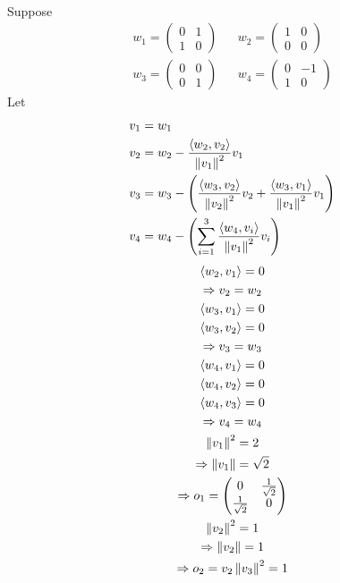 \begin{enumerate}
\begin{itemize}
\begin{gather}
\end{gather}
Suppose
\begin{align}
w_1 = \begin{pmatrix} 0 & 1\\1 & 0\end{pmatrix} & & w_2
= \begin{pmatrix}1 & 0 \\0 & 0 \end{pmatrix} \\
w_3 = \begin{pmatrix} 0 & 0 \\ 0 & 1\end{pmatrix} & &
w_4 =\begin{pmatrix} 0 & -1\\ 1 & 0\end{pmatrix}
\end{align}
Let
\begin{align}
v_1 &= w_1\\
v_2 &= w_2 - \frac{\langle w_2,v_2\rangle}{\left\lVert v_1\right\rVert^2}v_1\\
v_3 &= w_3 - \left(\frac{\langle w_3,v_2\rangle}{\left\lVert v_2\right\rVert^2}v_2 +
  \frac{\langle w_3,v_1\rangle}{\left\lVert v_1\right\rVert^2}v_1\right)\\
v_4 &= w_4 -\left(\sum\limits_{i=1}^3\frac{\langle w_4,v_i\rangle}{\left\lVert v_1\right\rVert^2}v_i\right)
\end{align}
\begin{gather}
\langle w_2,v_1\rangle = 0\\
\implies v_2 = w_2\\
\langle w_3,v_1\rangle = 0\\
\langle w_3,v_2\rangle = 0\\
\implies v_3 = w_3\\
\langle w_4,v_1\rangle = 0\\
\langle w_4,v_2\rangle = 0\\
\langle w_4,v_3\rangle = 0\\
\implies v_4 = w_4\\
\norm{v_1}^2 = 2\\
\implies \norm{v_1} = \sqrt{2}\\
\implies o_1 = \begin{pmatrix}
0 & \frac{1}{\sqrt{2}}\\
\frac{1}{\sqrt{2}} & 0
\end{pmatrix}\\
\norm{v_2}^2 = 1\\
\implies \norm{v_2} = 1\\
\implies o_2 = v_2
\norm{v_3}^2 = 1\\

\end{gather}
\end{itemize}
\end{enumerate}
